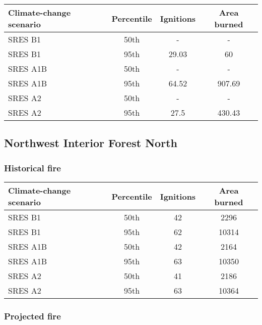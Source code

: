 \documentclass{article}\usepackage[]{graphicx}\usepackage[]{color}
\newcommand{\headcol}{\rowcolor{tableheadcolor}}
\begin{document}
\begin{table}[ht]
\centering
\begin{tabular}{lccc}
  \headcol 
 \toprule
Climate-change scenario & Percentile & Ignitions & Area burned \\ 
  \midrule
SRES B1 & 50th & - & - \\ 
  SRES B1 & 95th & 29.03 & 60 \\ 
  SRES A1B & 50th & - & - \\ 
  SRES A1B & 95th & 64.52 & 907.69 \\ 
  SRES A2 & 50th & - & - \\ 
  SRES A2 & 95th & 27.5 & 430.43 \\ 
   \bottomrule
\end{tabular}
\end{table}


\newpage
\subsection{Northwest Interior Forest North}
\subsubsection{Historical fire}

\begin{table}[ht]
\centering
\begin{tabular}{lccc}
  \headcol 
 \toprule
Climate-change scenario & Percentile & Ignitions & Area burned \\ 
  \midrule
SRES B1 & 50th & 42 & 2296 \\ 
  SRES B1 & 95th & 62 & 10314 \\ 
  SRES A1B & 50th & 42 & 2164 \\ 
  SRES A1B & 95th & 63 & 10350 \\ 
  SRES A2 & 50th & 41 & 2186 \\ 
  SRES A2 & 95th & 63 & 10364 \\ 
   \bottomrule
\end{tabular}
\end{table}


\subsubsection{Projected fire}
\end{document}
